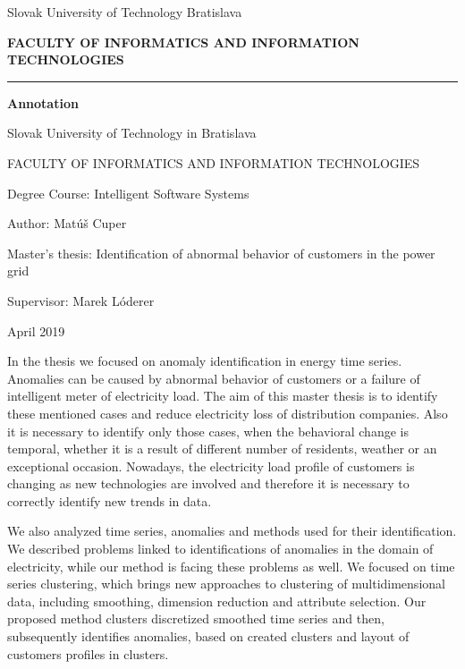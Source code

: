 \documentclass[a4paper,twoside,slovak,12pt,appendix]{article}
\begin{document}
\begin{titlepage}
\begin{center}
  {\small Slovak University of Technology Bratislava \par}
  {\small \textbf{FACULTY OF INFORMATICS AND INFORMATION TECHNOLOGIES}}
  \rule{\textwidth}{1pt}

  \vspace*{1.5cm}
  \begin{Large}
    \textbf{Annotation} \par
  \end{Large}
\end{center}
{Slovak University of Technology in Bratislava \par}
{FACULTY OF INFORMATICS AND INFORMATION TECHNOLOGIES \par}
{Degree Course: \indent Intelligent Software Systems \par}
{Author: \indent \indent \indent \vphantom{.} Matúš Cuper \par}
{Master's thesis: \indent Identification of abnormal behavior of customers in the power grid \par}
{Supervisor: \indent \indent Marek Lóderer \par}
{April 2019 \par}
\bigskip
In the thesis we focused on anomaly identification in energy time series.
Anomalies can be caused by abnormal behavior of customers or a failure of
intelligent meter of electricity load. The aim of this master thesis is to
identify these mentioned cases and reduce electricity loss of distribution
companies. Also it is necessary to identify only those cases, when the
behavioral change is temporal, whether it is a result of different number of
residents, weather or an exceptional occasion. Nowadays, the electricity load
profile of customers is changing as new technologies are involved and therefore
it is necessary to correctly identify new trends in data.

We also analyzed time series, anomalies and methods used for their
identification. We described problems linked to identifications of anomalies in
the domain of electricity, while our method is facing these problems as well. We
focused on time series clustering, which brings new approaches to clustering of
multidimensional data, including smoothing, dimension reduction and attribute
selection. Our proposed method clusters discretized smoothed time series and
then, subsequently identifies anomalies, based on created clusters and layout of
customers profiles in clusters.
\end{titlepage}
\newpage\null\thispagestyle{empty}\newpage
\end{document}

